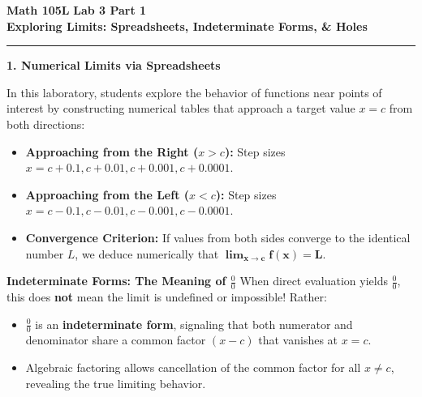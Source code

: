 \documentclass[10.5pt]{article}
\begin{document}
\noindent \textbf{\large Math 105L} \hfill \textbf{\large Lab 3 Part 1}\\[1pt]
{\textbf{\Large Exploring Limits: Spreadsheets, Indeterminate Forms, \& Holes}}\\[-5pt]
\rule{\textwidth}{1.2pt}

\vspace{0.03in}

\textbf{\large 1. Numerical Limits via Spreadsheets}

In this laboratory, students explore the behavior of functions near points of interest by constructing numerical tables that approach a target value $x = c$ from both directions:
\begin{itemize}[leftmargin=1.2em, topsep=1pt, itemsep=2pt]
  \item \textbf{Approaching from the Right ($x > c$):} Step sizes $x = c + 0.1, c + 0.01, c + 0.001, c + 0.0001$.
  \item \textbf{Approaching from the Left ($x < c$):} Step sizes $x = c - 0.1, c - 0.01, c - 0.001, c - 0.0001$.
  \item \textbf{Convergence Criterion:} If values from both sides converge to the identical number $L$, we deduce numerically that $\mathbf{\lim_{x\to c} f(x) = L}$.
\end{itemize}

\vspace{0.03in}

\begin{tcolorbox}[colback=boxbg, colframe=boxframe, boxrule=0.8pt, arc=3pt, left=8pt, right=8pt, top=4pt, bottom=4pt]
\textbf{\large Indeterminate Forms: The Meaning of $\frac{0}{0}$}
When direct evaluation yields $\frac{0}{0}$, this does \textbf{not} mean the limit is undefined or impossible! Rather:
\begin{itemize}[leftmargin=1.2em, topsep=1pt, itemsep=2pt]
  \item $\frac{0}{0}$ is an \textbf{indeterminate form}, signaling that both numerator and denominator share a common factor $(x - c)$ that vanishes at $x = c$.
  \item Algebraic factoring allows cancellation of the common factor for all $x \ne c$, revealing the true limiting behavior.
\end{itemize}
\end{tcolorbox}
\end{document}
